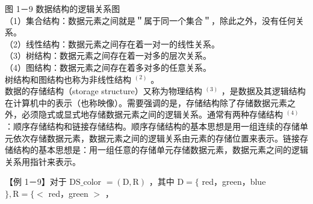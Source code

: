 \documentclass[10pt]{article}
\begin{document}
图 1－9 数据结构的逻辑关系图\\
（1）集合结构：数据元素之间就是＂属于同一个集合＂，除此之外，没有任何关系。\\
（2）线性结构：数据元素之间存在着一对一的线性关系。\\
（3）树结构：数据元素之间存在着一对多的层次关系。\\
（4）图结构：数据元素之间存在着多对多的任意关系。\\
树结构和图结构也称为非线性结构 ${ }^{(2)}$ 。\\
数据的存储结构（storage structure）又称为物理结构 ${ }^{(3)}$ ，是数据及其逻辑结构在计算机中的表示（也称映像）。需要强调的是，存储结构除了存储数据元素之外，必须隐式或显式地存储数据元素之间的逻辑关系。通常有两种存储结构 ${ }^{(4)}$ ：顺序存储结构和链接存储结构。顺序存储结构的基本思想是用一组连续的存储单元依次存储数据元素，数据元素之间的逻辑关系由元素的存储位置来表示。链接存储结构的基本思想是：用一组任意的存储单元存储数据元素，数据元素之间的逻辑关系用指针来表示。

【例 1－9】对于 $\mathrm{DS} \_$color $=(\mathrm{D}, \mathrm{R})$ ，其中 $\mathrm{D}=\{$ red，green，blue $\}, \mathrm{R}=\{<$ red，green $>$ ，
\end{document}
